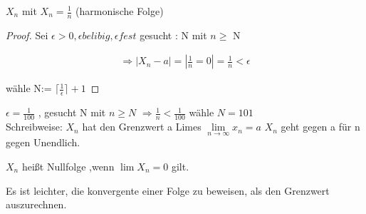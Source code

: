 \begin{example}

    $X_n$ mit $X_n = \frac{1}{n}$ (harmonische Folge)

\end{example}

\begin{proof}
    Sei $\epsilon > 0 , \epsilon belibig , \epsilon fest$
    gesucht : N mit $n \geq$ N

    \begin{gather}
        \Rightarrow |X_n-a|= |\frac{1}{n} =0|=\frac{1}{n}<\epsilon
    \end{gather}

    wähle N:= $\lceil \frac{1}{\epsilon} \rceil +1$

\end{proof}

\begin{example}
    $\epsilon = \frac{1}{100}$ , gesucht N mit $n \geq N$
    $\Rightarrow \frac{1}{n} < \frac{1}{100}$ wähle $N=101$\\


    Schreibweise: $X_n$ hat den Grenzwert a Limes
    $\lim\limits_{n \rightarrow \infty}{x_n}=a$
    $X_n$ geht gegen a für n gegen Unendlich.
\end{example}

\begin{definition}
    $X_n$ heißt Nullfolge ,wenn $\lim\limits{X_n}=0$ gilt.
\end{definition}

\begin{remark}

    Es ist leichter, die konvergente einer Folge zu beweisen, als den Grenzwert auszurechnen.

\end{remark}

